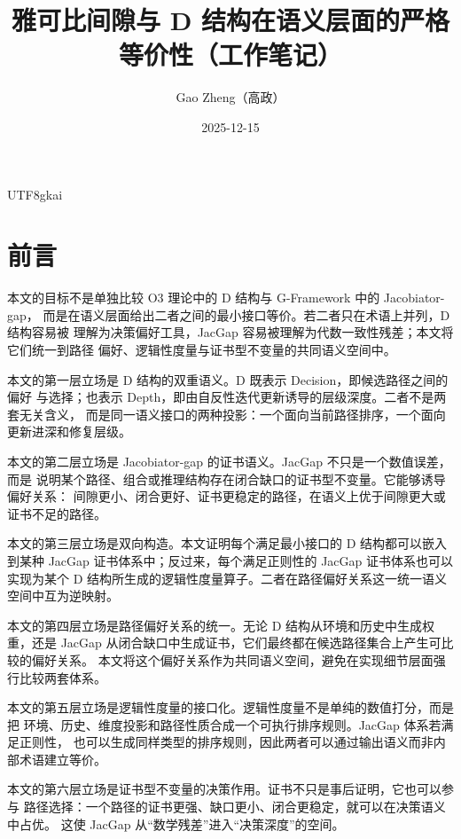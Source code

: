 \documentclass[12pt]{article}
\begin{document}
\begin{CJK*}{UTF8}{gkai}
\sloppy

\title{雅可比间隙与 D 结构在语义层面的严格等价性（工作笔记）}
\author{Gao Zheng（高政）}
\date{2025-12-15}
\maketitle

\section*{前言}

本文的目标不是单独比较 O3 理论中的 D 结构与 G-Framework 中的 Jacobiator-gap，
而是在语义层面给出二者之间的最小接口等价。若二者只在术语上并列，D 结构容易被
理解为决策偏好工具，JacGap 容易被理解为代数一致性残差；本文将它们统一到路径
偏好、逻辑性度量与证书型不变量的共同语义空间中。

本文的第一层立场是 D 结构的双重语义。D 既表示 Decision，即候选路径之间的偏好
与选择；也表示 Depth，即由自反性迭代更新诱导的层级深度。二者不是两套无关含义，
而是同一语义接口的两种投影：一个面向当前路径排序，一个面向更新进深和修复层级。

本文的第二层立场是 Jacobiator-gap 的证书语义。JacGap 不只是一个数值误差，而是
说明某个路径、组合或推理结构存在闭合缺口的证书型不变量。它能够诱导偏好关系：
间隙更小、闭合更好、证书更稳定的路径，在语义上优于间隙更大或证书不足的路径。

本文的第三层立场是双向构造。本文证明每个满足最小接口的 D 结构都可以嵌入到某种
JacGap 证书体系中；反过来，每个满足正则性的 JacGap 证书体系也可以实现为某个
D 结构所生成的逻辑性度量算子。二者在路径偏好关系这一统一语义空间中互为逆映射。

本文的第四层立场是路径偏好关系的统一。无论 D 结构从环境和历史中生成权重，还是
JacGap 从闭合缺口中生成证书，它们最终都在候选路径集合上产生可比较的偏好关系。
本文将这个偏好关系作为共同语义空间，避免在实现细节层面强行比较两套体系。

本文的第五层立场是逻辑性度量的接口化。逻辑性度量不是单纯的数值打分，而是把
环境、历史、维度投影和路径性质合成一个可执行排序规则。JacGap 体系若满足正则性，
也可以生成同样类型的排序规则，因此两者可以通过输出语义而非内部术语建立等价。

本文的第六层立场是证书型不变量的决策作用。证书不只是事后证明，它也可以参与
路径选择：一个路径的证书更强、缺口更小、闭合更稳定，就可以在决策语义中占优。
这使 JacGap 从“数学残差”进入“决策深度”的空间。


\end{CJK*}
\end{document}
